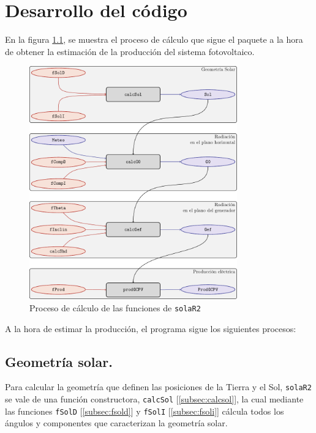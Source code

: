 \chapter{Desarrollo del código}
\label{chap:desarrollo-codigo}
En la figura \ref{fig:org9ba4490}, se muestra el proceso de cálculo que sigue el paquete a la hora de obtener la estimación de la producción del sistema fotovoltaico.
\begin{figure}[]
\centering
\includegraphics[keepaspectratio,width=0.8\textwidth,height=0.5\textheight]{figuras/procedure.pdf}
\caption{\label{fig:org9ba4490}Proceso de cálculo de las funciones de \texttt{solaR2}}
\end{figure}
A la hora de estimar la producción, el programa sigue los siguientes procesos:
\section{Geometría solar.}
\label{sec:org3065f42}
\label{sec:geometria-solar}
Para calcular la geometría que definen las posiciones de la Tierra y el Sol, \texttt{solaR2} se vale de una función constructora, \texttt{calcSol} [\ref{subsec:calcsol}], la cual mediante las funciones \texttt{fSolD} [\ref{subsec:fsold}] y \texttt{fSolI} [\ref{subsec:fsoli}] cálcula todos los ángulos y componentes que caracterizan la geometría solar.

